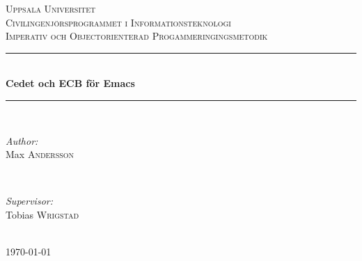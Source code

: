 \documentclass[12pt]{article} %
\begin{document}

\begin{titlepage}

\newcommand{\HRule}{\rule{\linewidth}{0.5mm}} %

\center %

\textsc{\LARGE Uppsala Universitet}\\[1.5cm] %
\textsc{\Large Civilingenjörsprogrammet i Informationsteknologi}\\[0.5cm] %
\textsc{\large Imperativ och Objectorienterad Progammeringingsmetodik}\\[0.5cm] %

\HRule \\[0.4cm]
{ \huge \bfseries Cedet och ECB för Emacs}\\[0.4cm] %
\HRule \\[1.5cm]

\begin{minipage}{0.4\textwidth}
\begin{flushleft} \large
\emph{Author:}\\
Max \textsc{Andersson} %
\end{flushleft}
\end{minipage}
~
\begin{minipage}{0.4\textwidth}
\begin{flushright} \large
\emph{Supervisor:} \\
Tobias \textsc{Wrigstad} %
\end{flushright}
\end{minipage}\\[4cm]

{\large \today}\\[3cm] %


\vfill %

\end{titlepage}
\end{document}
